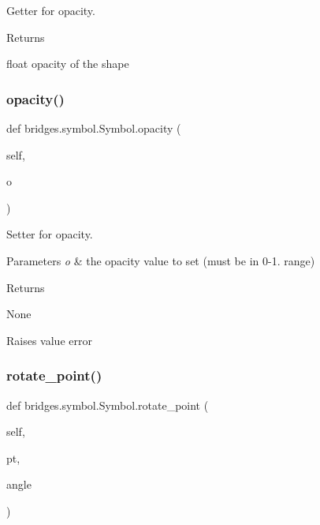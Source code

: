 Getter for opacity. 

\begin{DoxyReturn}{Returns}


float opacity of the shape 
\end{DoxyReturn}
\mbox{\label{classbridges_1_1symbol_1_1_symbol_afea86f6d7c341168810c09159780ea83}} 
\subsubsection{\texorpdfstring{opacity()}{opacity()}\hspace{0.1cm}{\footnotesize\ttfamily [2/2]}}
{\footnotesize\ttfamily def bridges.\+symbol.\+Symbol.\+opacity (\begin{DoxyParamCaption}\item[{}]{self,  }\item[{}]{o }\end{DoxyParamCaption})}



Setter for opacity. 


\begin{DoxyParams}{Parameters}
{\em o} & the opacity value to set (must be in 0-\/1. range) \\
\hline
\end{DoxyParams}
\begin{DoxyReturn}{Returns}


None 

Raises value error 
\end{DoxyReturn}
\mbox{\label{classbridges_1_1symbol_1_1_symbol_a81d55230ba4fec6c9a31d76cfc97bc96}} 
\subsubsection{\texorpdfstring{rotate\+\_\+point()}{rotate\_point()}}
{\footnotesize\ttfamily def bridges.\+symbol.\+Symbol.\+rotate\+\_\+point (\begin{DoxyParamCaption}\item[{}]{self,  }\item[{}]{pt,  }\item[{}]{angle }\end{DoxyParamCaption})}



